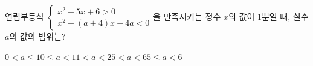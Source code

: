 \hspace*{2mm}\begin{minipage}[t]{\dimexpr\linewidth-2mm\relax}\vspace{0pt}
연립부등식 $\begin{cases} x^2-5x+6>0 \\ x^2-(a+4)x+4a<0 \end{cases}$을 만족시키는 정수 $x$의 값이 $1$뿐일 때, 실수 $a$의 값의 범위는?
\begin{choices32}{$0<a\le 1$}{$0\le a<1$}{$1<a<2$}{$5<a<6$}{$5\le a<6$}\end{choices32}\end{minipage}
